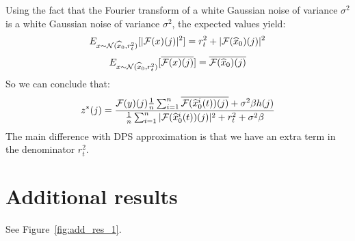 %
Using the fact that the Fourier transform of a white Gaussian noise of variance $\sigma^2$ is a white Gaussian noise of variance $\sigma^2$, the expected values yield:
$$ E_{x \sim \mathcal{N}(\widehat{x}_0, r_t^2)}[|{\mathcal{F}(x)}(j)|^2] = r_t^2 + |\mathcal{F}(\widehat{x}_0)(j)|^2 $$
$$ E_{x \sim \mathcal{N}(\widehat{x}_0, r_t^2)}[\overline{{\mathcal{F}(x)}(j)}] =  \overline{\mathcal{F}(\widehat{x}_0)(j)} $$
So we can conclude that:
\begin{equation}\label{eq:proxQbis}
z^*(j) = \frac{{\mathcal{F}(y)}(j)\frac{1}{n}\sum_{i=1}^n{\overline{\mathcal{F}(\widehat{x}_0^i(t))(j)}} + \sigma^2 \beta h(j)}{\frac{1}{n}\sum_{i=1}^n{|\mathcal{F}(\widehat{x}_0^i(t))(j)|^2}  + r_t^2 + \sigma^2 \beta }
\end{equation}
The main difference with DPS approximation is that we have an extra term in the denominator $r_t^2$.

\section{Additional results}\label{sec:additional_results}

See Figure~\ref{fig:add_res_1}.

